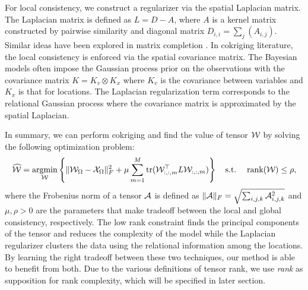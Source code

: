 For local consistency, we construct a regularizer via the spatial Laplacian matrix. The Laplacian matrix is defined as  $L = D-A$, where $A$ is a kernel matrix constructed by pairwise similarity %
and diagonal matrix $D_{i,i}= \sum_{j} (A_{i,j})$. %
Similar ideas have been explored in matrix completion \cite{li2009relation}. In cokriging literature, the local consistency is enforced via the spatial covariance matrix. The Bayesian models often impose the Gaussian process prior on the observations with the covariance matrix $K = K_v \otimes K_x $ where $K_v$ is the covariance between variables and $K_x$ is that for locations. The Laplacian regularization term corresponds to the relational Gaussian process \cite{chu2006relational} where the covariance matrix is approximated by the spatial Laplacian.


In summary, we can perform cokriging and find the value of tensor ${\mathcal W}$ by solving the following optimization problem:
\begin{align}
\widehat{{\mathcal W}} =\operatorname*{argmin}_{{\mathcal W}}& \left\{ \|{\mathcal W}_\Omega - {\mathcal X}_\Omega \|^2_F +  \mu \sum\limits_{m=1}^M \text{tr} ({\mathcal W}_{:,:,m}^\top L {\mathcal W}_{:,:,m}) \right\} \quad
\mathrm{s.t.} \;&  \text{rank}({\mathcal W}) \leq \rho,  \label{eqn:cokriging}
\end{align}
\noindent  where the Frobenius norm of a tensor ${\mathcal A}$ is defined as $\|{\mathcal A}\|_F = \sqrt{\sum_{i, j, k}{\mathcal A}_{i, j, k}^2}$ and $\mu, \rho > 0$ are the parameters that make  tradeoff between the local and global consistency, respectively.  The low rank constraint finds the principal components of the tensor and reduces the complexity of the model while the Laplacian regularizer clusters the data using the relational information among the locations.  By learning the right tradeoff between these two techniques, our method is able to benefit from both. Due to the various definitions of tensor rank, we use \textit{rank} as supposition for rank complexity, which will be specified in later section.
